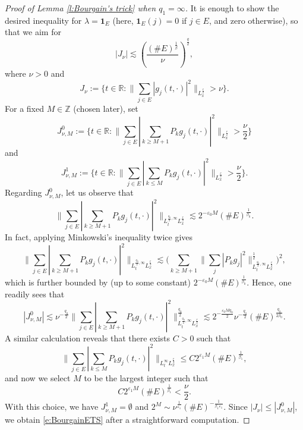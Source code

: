 \documentclass[a4paper]{amsart}
\numberwithin{equation}{section}%
\theoremstyle{plain}%
\theoremstyle{definition}
\theoremstyle{remark}%
\begin{document}
\begin{proof}[Proof of Lemma \ref{l:Bourgain's trick} when $q_1 = \infty$]
It is enough to show the desired inequality for $\lambda = \textbf{1}_E$ (here, $\textbf{1}_E(j) = 0$ if $j \in E$, and zero otherwise), so that we aim for 
\begin{equation} \label{e:BourgainETS}
|J_\nu|
\lesssim 
\left(
\frac{(\# E)^\frac1\beta}{\nu}
\right)^\frac q2,
\end{equation}
where $\nu>0$ and
\[
J_\nu
:=
\Big\{t\in\mathbb R: \Big\|\sum_{j\in E}|g_j(t,\cdot)|^2\Big\|_{L_x^\frac r2}>\nu \Big\}.
\]
For a fixed $M\in\mathbb Z$ (chosen later), set 
\[
J_{\nu,M}^0
:=
\Big\{t\in\mathbb R: \Big\|\sum_{j\in E}|\sum_{k\geq M+1}P_k g_j(t,\cdot)|^2\Big\|_{L_x^\frac r2}>\frac\nu2 \Big\}
\]
and
\[
J_{\nu,M}^1
:=
\Big\{t\in\mathbb R: \Big\|\sum_{j\in E}|\sum_{k\leq M} P_k g_j(t,\cdot)|^2\Big\|_{L_x^\frac r2}>\frac\nu2 \Big\}.
\]
Regarding $J_{\nu,M}^0$, let us observe that 
\[
 \Big\|\sum_{j\in E}|\sum_{k \geq M+1}P_k g_j(t,\cdot)|^2\Big\|_{L_t^{\frac{q_0}{2}, \infty} L_x^\frac r2}
 \lesssim
 2^{-\varepsilon_0M}(\# E)^\frac{1}{\beta_0}.
\]
In fact, applying Minkowski's inequality twice gives
\[
 \Big\|\sum_{j\in E}|\sum_{k\geq M+1} P_k g_j(t,\cdot)|^2\Big\|_{L_t^{\frac{q_0}{2}, \infty} L_x^\frac r2}
 \lesssim
\Big(\sum_{k\geq M+1}\Big\|\sum_{j}|P_kg_j|^2\Big\|_{L_t^{\frac{q_0}{2}, \infty} L_x^{\frac r2}}^\frac12\Big)^2,
\]
which is further bounded by (up to some constant)
$
2^{-\varepsilon_0M} (\# E)^\frac{1}{\beta_0}.
$
Hence, one readily sees that 
\[
|J_{\nu,M}^0| 
\lesssim \nu^{-\frac{q_0}{2}} \Big\|\sum_{j\in E}|\sum_{k\geq M+1} P_k g_j(t,\cdot)|^2\Big\|_{L_t^{\frac{q_0}{2}, \infty} L_x^\frac r2}^{\frac{q_0}{2}}
\lesssim 2^{-\frac{\varepsilon_0Mq_0}{2}}\nu^{-\frac{q_0}{2}}(\# E)^\frac{q_0}{2\beta_0}.
\]
A similar calculation reveals that there exists $C>0$ such that
\[
\Big\|\sum_{j\in E}|\sum_{k\leq M} P_k g_j(t,\cdot)|^2\Big\|_{L_t^{\infty} L_x^\frac r2}
\leq 
C 2^{\varepsilon_1M}(\# E)^\frac{1}{\beta_1},
\]
and now we select $M$ to be the largest integer such that 
\[
C 2^{\varepsilon_1M}(\# E)^\frac{1}{\beta_1}
<
\frac\nu2.
\]
With this choice, we have $J_{\nu,M}^1 = \emptyset$ and
$
2^{M}
\sim
\nu^{\frac{1}{\varepsilon_1}} (\# E)^{-\frac{1}{\beta_1 \varepsilon_1}}.
$
Since $|J_\nu|\leq |J_{\nu,M}^0|$, we obtain \eqref{e:BourgainETS} after a straightforward computation.
\end{proof}
\end{document}
